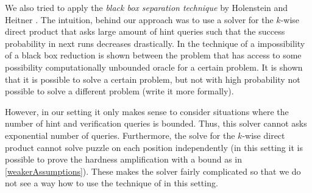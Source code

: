 We also tried to apply the \textit{black box separation technique} by Holenstein and Heitner \cite{haitner2009possibility}.
The intuition, behind our approach was to use a solver for the $k$-wise direct product that asks large amount of hint queries such that
the success probability in next runs decreases drastically.
In the technique of \cite{haitner2009possibility} a impossibility of a black box reduction is shown between the problem that has access
to some possibility computationally unbounded oracle for a certain problem. It is shown that it is possible to solve a certain problem,
but not with high probability not possible to solve a different problem (write it more formally).

However, in our setting it only makes sense to consider situations where the number of hint and verification queries is bounded.
Thus, this solver cannot asks exponential number of queries. Furthermore, the solve for the $k$-wise direct product cannot solve puzzle on each position
independently (in this setting it is possible to prove the hardness amplification with a bound as in \ref{weakerAssumptions}).
These makes the solver fairly complicated so that we do not see a way how to use the technique of \cite{haitner2009possibility} in this setting.


%
%
